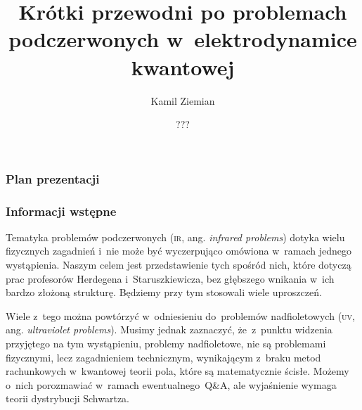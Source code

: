 \documentclass[10pt,t]{beamer}
\title{Krótki przewodni po problemach podczerwonych
  w~elektrodynamice kwantowej}
\author{Kamil Ziemian \\
  \email}
\date[???]{???}
\begin{document}





\RaggedRight





\maketitle





\begin{frame}
  \frametitle{Plan prezentacji}


  \tableofcontents

\end{frame}










\begin{frame}
  \frametitle{Informacji wstępne}


  Tematyka problemów podczerwonych (\textsc{ir}, ang. \textit{infrared
    problems}) dotyka wielu fizycznych zagadnień i~nie może być
  wyczerpująco omówiona w~ramach jednego wystąpienia. Naszym
  celem jest przedstawienie tych spośród nich, które dotyczą prac profesorów
  Herdegena i~Staruszkiewicza, bez głębszego wnikania w~ich bardzo złożoną
  strukturę. Będziemy przy tym stosowali wiele uproszczeń.

  Wiele z~tego można powtórzyć w~odniesieniu do~problemów nadfioletowych
  (\textsc{uv}, ang. \textit{ultraviolet problems}). Musimy jednak
  zaznaczyć, że~z~punktu widzenia przyjętego na tym wystąpieniu, problemy
  nadfioletowe, \alert{nie} są problemami fizycznymi, lecz zagadnieniem
  technicznym, wynikającym z~braku metod rachunkowych w~kwantowej teorii
  pola, które są matematycznie ścisłe. Możemy o~nich porozmawiać
  w~ramach ewentualnego~Q\&A, ale wyjaśnienie wymaga teorii dystrybucji
  Schwartza.


\end{frame}
\end{document}
